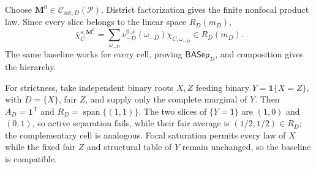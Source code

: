 Choose \(\mathbf M^0\in\mathcal C_{\mathrm{sat},D}(\mathcal P)\).  District factorization gives the finite nonfocal product law.  Since every slice belongs to the linear space \(R_D(m_D)\),
\[
\bar\chi_C^{s,\mathbf M^0}=
\sum_{\omega_{-D}}\nu_{-D}^{0,s}(\omega_{-D})\chi_{C,\omega_{-D}}
\in R_D(m_D).
\]
The same baseline works for every cell, proving \(\mathsf{BASep}_D\), and composition gives the hierarchy.

For strictness, take independent binary roots \(X,Z\) feeding binary \(Y=\mathbf1\{X=Z\}\), with \(D=\{X\}\), fair \(Z\), and supply only the complete marginal of \(Y\).  Then \(A_D=\mathbf1^{\mathsf T}\) and \(R_D=\operatorname{span}\{(1,1)\}\).  The two slices of \(\{Y=1\}\) are \((1,0)\) and \((0,1)\), so active separation fails, while their fair average is \((1/2,1/2)\in R_D\); the complementary cell is analogous.  Focal saturation permits every law of \(X\) while the fixed fair \(Z\) and structural table of \(Y\) remain unchanged, so the baseline is compatible.